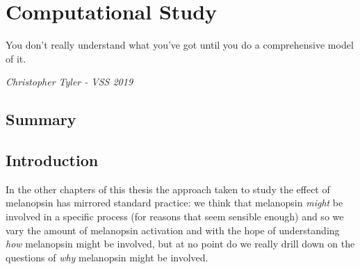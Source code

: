 \chapter{Computational Study}
\label{ComputationalStudyChapter}

\epigraph{You don't really understand what you've got until you do a comprehensive model of it.}
{\textit{Christopher Tyler - VSS 2019}}


\section{Summary}




\section{Introduction}

In the other chapters of this thesis the approach taken to study the effect of melanopsin has mirrored standard practice: we think that melanopsin \emph{might} be involved in a specific process (for reasons that seem sensible enough) and so we vary the amount of melanopsin activation and with the hope of understanding \emph{how} melanopsin might be involved, but at no point do we really drill down on the questions of \emph{why} melanopsin might be involved.

